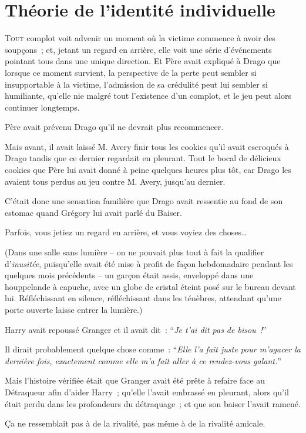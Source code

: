 \chapter{Théorie de l'identité individuelle}

\lettrine{T}{out} complot voit advenir un moment où la victime commence à avoir des soupçons~; et, jetant un regard en arrière, elle voit une série d'événements pointant tous dans une unique direction. Et Père avait expliqué à Drago que lorsque ce moment survient, la perspective de la perte peut sembler si insupportable à la victime, l'admission de sa crédulité peut lui sembler si humiliante, qu'elle nie malgré tout l'existence d'un complot, et le jeu peut alors continuer longtemps.

Père avait prévenu Drago qu'il ne devrait plus recommencer.

Mais avant, il avait laissé M. Avery finir tous les cookies qu'il avait escroqués à Drago tandis que ce dernier regardait en pleurant. Tout le bocal de délicieux cookies que Père lui avait donné à peine quelques heures plus tôt, car Drago les avaient tous perdus au jeu contre M. Avery, jusqu'au dernier.

C'était donc une sensation familière que Drago avait ressentie au fond de son estomac quand Grégory lui avait parlé du Baiser.

Parfois, vous jetiez un regard en arrière, et vous voyiez des choses…

(Dans une salle sans lumière -- on ne pouvait plus tout à fait la qualifier d'\emph{inusitée}, puisqu'elle avait été mise à profit de façon hebdomadaire pendant les quelques mois précédents -- un garçon était assis, enveloppé dans une houppelande à capuche, avec un globe de cristal éteint posé sur le bureau devant lui. Réfléchissant en silence, réfléchissant dans les ténèbres, attendant qu'une porte ouverte laisse entrer la lumière.)

Harry avait repoussé Granger et il avait dit~: “\emph{Je t'ai dit pas de bisou~!}”

Il dirait probablement quelque chose comme~: “\emph{Elle l'a fait juste pour m'agacer la dernière fois, exactement comme elle m'a fait aller à ce rendez-vous galant.}”

Mais l'histoire vérifiée était que Granger avait été prête à refaire face au Détraqueur afin d'aider Harry~; qu'elle l'avait embrassé en pleurant, alors qu'il était perdu dans les profondeurs du détraquage~; et que son baiser l'avait ramené.

Ça ne ressemblait pas à de la rivalité, pas même à de la rivalité amicale.

